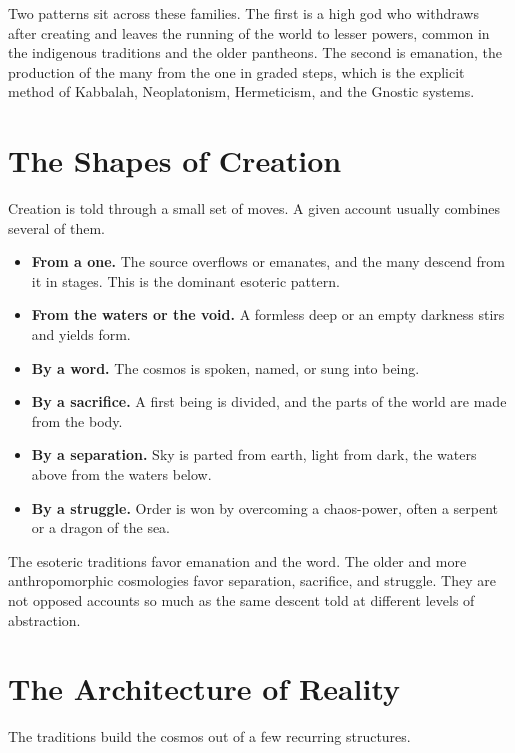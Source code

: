 Two patterns sit across these families. The first is a high god who withdraws after creating and leaves the
running of the world to lesser powers, common in the indigenous traditions and the older pantheons. The
second is emanation, the production of the many from the one in graded steps, which is the explicit method of
Kabbalah, Neoplatonism, Hermeticism, and the Gnostic systems.

\section{The Shapes of Creation}

Creation is told through a small set of moves. A given account usually combines several of them.

\begin{itemize}
  \item \textbf{From a one.} The source overflows or emanates, and the many descend from it in stages. This
  is the dominant esoteric pattern.
  \item \textbf{From the waters or the void.} A formless deep or an empty darkness stirs and yields form.
  \item \textbf{By a word.} The cosmos is spoken, named, or sung into being.
  \item \textbf{By a sacrifice.} A first being is divided, and the parts of the world are made from the body.
  \item \textbf{By a separation.} Sky is parted from earth, light from dark, the waters above from the waters
  below.
  \item \textbf{By a struggle.} Order is won by overcoming a chaos-power, often a serpent or a dragon of the
  sea.
\end{itemize}

The esoteric traditions favor emanation and the word. The older and more anthropomorphic cosmologies favor
separation, sacrifice, and struggle. They are not opposed accounts so much as the same descent told at
different levels of abstraction.

\section{The Architecture of Reality}

The traditions build the cosmos out of a few recurring structures.

